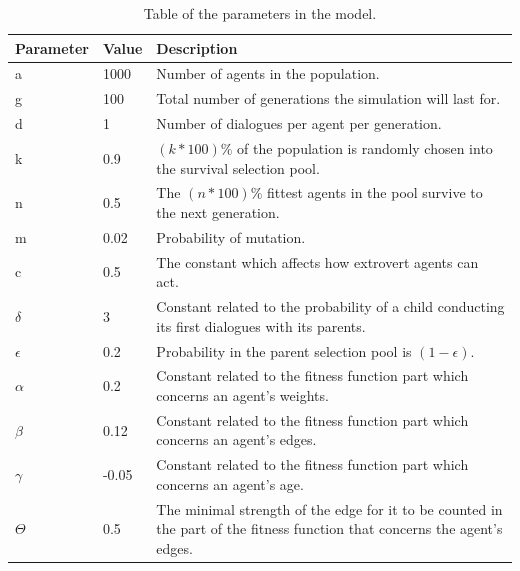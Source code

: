 \begin{table}[htbp]
    \centering
    \caption[The parameters in the model.]{Table of the parameters in the model.}\label{tab:params}
    \begin{tabu} to 1.0\textwidth { X[1,c] X[1,c] X[5,p] }%
         \hline
         \rowfont\bfseries
         Parameter & Value & Description \\ 
         \hline
         a & 1000 & Number of agents in the population. \\ 
         g & 100 & Total number of generations the simulation will last for. \\

         d & 1 & Number of dialogues per agent per generation. \\

         k & 0.9 & $(k \ast 100 )\%$ of the population is randomly chosen into the survival selection pool. \\

         n & 0.5 & The $(n \ast 100 )\%$ fittest agents in the pool survive to the next generation. \\ 

         m & 0.02 & Probability of mutation. \\

         c & 0.5 & The constant which affects how extrovert agents can act. \\
         $\delta$ & 3 & Constant related to the probability of a child conducting its first dialogues with its parents.\\
         
         $\epsilon$ & 0.2 & Probability in the parent selection pool is $(1-\epsilon)$.\\ 

          $\alpha$ & 0.2 & Constant related to the fitness function part which concerns an agent's weights.\\

          $\beta$ & 0.12 & Constant related to the fitness function part which concerns an agent's edges. \\

         $\gamma$ & -0.05 & Constant related to the fitness function part which concerns an agent's age. \\
         
         $\Theta$ & 0.5 & The minimal strength of the edge for it to be counted in the part of the fitness function that concerns the agent's edges.\\
         \hline
    \end{tabu}
\end{table}

